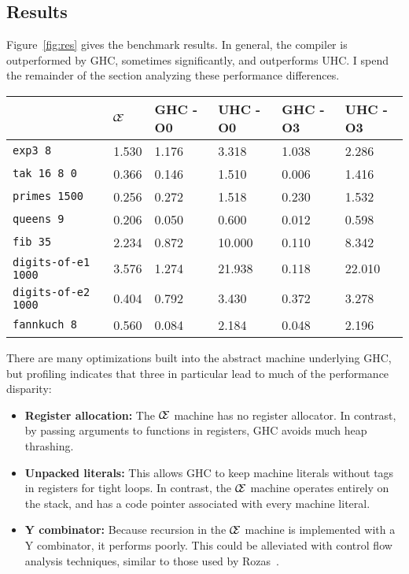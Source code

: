\subsection{Results} \label{sec:res}

Figure~\ref{fig:res} gives the benchmark results.  In general, the compiler is
outperformed by GHC, sometimes significantly, and outperforms UHC. I spend the
remainder of the section analyzing these performance differences.

\begin{figure*}
\centering
\begin{tabularx}{\textwidth}{l | X | X | X | X | X}
& $\mathcal{\mathcal{C} \mskip -4mu \mathcal{E}}$ & GHC -O0 & UHC -O0 & GHC -O3 & UHC -O3 \\
\hline
\texttt{exp3 8} & 1.530 & 1.176 & 3.318 & 1.038 & 2.286 \\
\texttt{tak 16 8 0} & 0.366 & 0.146 & 1.510 & 0.006 & 1.416 \\
\texttt{primes 1500} & 0.256 & 0.272 & 1.518 & 0.230 & 1.532 \\
\texttt{queens 9} & 0.206 & 0.050 & 0.600 & 0.012 & 0.598 \\
\texttt{fib 35} & 2.234 & 0.872 & 10.000 & 0.110 & 8.342 \\
\texttt{digits-of-e1 1000} & 3.576 & 1.274 & 21.938 & 0.118 & 22.010 \\
\texttt{digits-of-e2 1000} & 0.404 & 0.792 & 3.430 & 0.372 & 3.278 \\
\texttt{fannkuch 8} & 0.560 & 0.084 & 2.184 & 0.048 & 2.196 \\
\end{tabularx}
\caption{Machine Literals Benchmark Results. Measurement is wall clock time,
units are seconds. Times averaged over 5 runs. Variance is relatively low
($\approx10\%$).}
\label{fig:res}
\end{figure*}

There are many optimizations built into the abstract machine underlying GHC,
but profiling indicates that three in particular lead to much of the performance
disparity: 

\begin{itemize}
\item \textbf{Register allocation:} The $\mathcal{\mathcal{C} \mskip -4mu \mathcal{E}}$ machine has no register
allocator. In contrast, by passing arguments to functions in registers, GHC
avoids much heap thrashing.
\item \textbf{Unpacked literals:} This allows GHC to keep machine literals
without tags in registers for tight loops. In contrast, the $\mathcal{\mathcal{C} \mskip -4mu \mathcal{E}}$
machine operates entirely on the stack, and has a code pointer associated with
every machine literal. 
\item \textbf{Y combinator:} Because recursion in the $\mathcal{\mathcal{C} \mskip -4mu \mathcal{E}}$ machine is
implemented with a Y combinator, it performs poorly. This could be alleviated
with control flow analysis techniques, similar to those used by Rozas~\cite{rozas1992taming}. 
\end{itemize}


